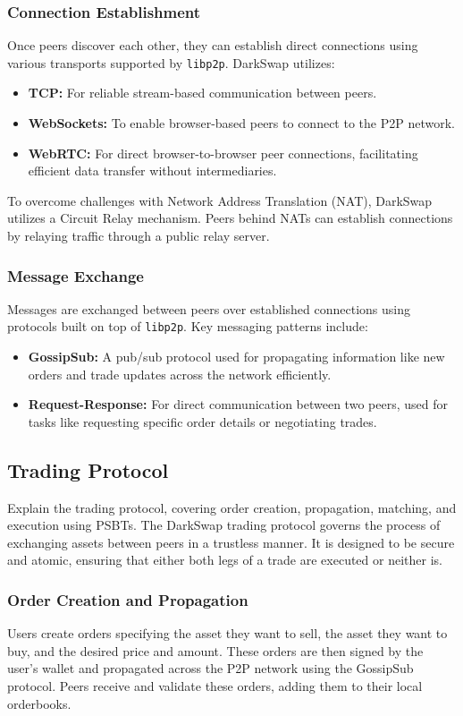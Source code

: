 \documentclass{article}
\begin{document}
\subsubsection{Connection Establishment}
Once peers discover each other, they can establish direct connections using various transports supported by \texttt{libp2p}. DarkSwap utilizes:
\begin{itemize}
    \item \textbf{TCP:} For reliable stream-based communication between peers.
    \item \textbf{WebSockets:} To enable browser-based peers to connect to the P2P network.
    \item \textbf{WebRTC:} For direct browser-to-browser peer connections, facilitating efficient data transfer without intermediaries.
\end{itemize}
To overcome challenges with Network Address Translation (NAT), DarkSwap utilizes a Circuit Relay mechanism. Peers behind NATs can establish connections by relaying traffic through a public relay server.

\subsubsection{Message Exchange}
Messages are exchanged between peers over established connections using protocols built on top of \texttt{libp2p}. Key messaging patterns include:
\begin{itemize}
    \item \textbf{GossipSub:} A pub/sub protocol used for propagating information like new orders and trade updates across the network efficiently.
    \item \textbf{Request-Response:} For direct communication between two peers, used for tasks like requesting specific order details or negotiating trades.
\end{itemize}
\subsection{Trading Protocol}
Explain the trading protocol, covering order creation, propagation, matching, and execution using PSBTs.
The DarkSwap trading protocol governs the process of exchanging assets between peers in a trustless manner. It is designed to be secure and atomic, ensuring that either both legs of a trade are executed or neither is.

\subsubsection{Order Creation and Propagation}
Users create orders specifying the asset they want to sell, the asset they want to buy, and the desired price and amount. These orders are then signed by the user's wallet and propagated across the P2P network using the GossipSub protocol. Peers receive and validate these orders, adding them to their local orderbooks.
\end{document}
